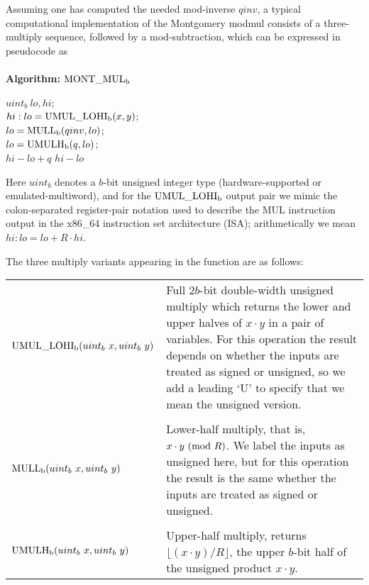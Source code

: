 \documentclass{article}
\begin{document}
Assuming one has computed the needed mod-inverse $qinv$, a typical computational implementation of the Montgomery modmul consists of a three-multiply sequence, followed by a mod-subtraction, which can be expressed in pseudocode as\\
\\
{\bf Algorithm:} ${\rm MONT\_MUL_b}$\\
\IncMargin{5em} \begin{algorithm}[H]
\SetAlgoLined
{}
\vspace{0.1in}
{
	$uint_b\ lo,hi$;\\
	$hi:lo = {\rm UMUL\_LOHI_b}(x, y)$;\\
	$lo = {\rm MULL_b}(qinv, lo)$;\\
	$lo = {\rm UMULH_b}(   q, lo)$;\\
	 {
		\Return $hi - lo + q$\;
	}{
		\Return $hi - lo$\;
	}
}
\label{MM}
\end{algorithm}
\vspace{0.1in}
Here $uint_b$ denotes a $b$-bit unsigned integer type (hardware-supported or emulated-multiword), and for the ${\rm UMUL\_LOHI_b}$ output pair we mimic the colon-separated register-pair notation used to describe the MUL instruction output in the x86\_64 instruction set architecture (ISA); arithmetically we mean $hi:lo = lo + R \cdot hi$.

\vspace{0.1in}
\noindent The three multiply variants appearing in the function are as follows:
\begin{table}[ht]
\begin{center}
\begin{tabular}{l p{3in}}
${\rm UMUL\_LOHI_b}(uint_b\ x, uint_b\ y)$	&	Full $2b$-bit double-width unsigned multiply which returns the lower and upper halves of $x \cdot y$ in a pair of variables. For this operation the result depends on whether the inputs are treated as signed or unsigned, so we add a leading `U' to specify that we mean the unsigned version.\\
\\
${\rm MULL_b}(uint_b\ x, uint_b\ y)$&	Lower-half multiply, that is, $x \cdot y\ ({\rm mod}\ R)$. We label the inputs as unsigned here, but for this operation the result is the same whether the inputs are treated as signed or unsigned.\\
\\
${\rm UMULH_b}(uint_b\ x, uint_b\ y)$&	Upper-half multiply, returns $\lfloor (x \cdot y)/R \rfloor$, the upper $b$-bit half of the unsigned product $x \cdot y$.
\end{tabular}
\end{center}
\end{table}
\setcounter{table}{0}
\end{document}
